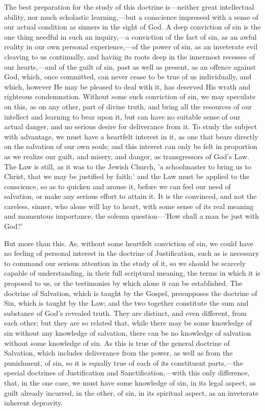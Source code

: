 \documentclass[
]{book}
\begin{document}
The best preparation for the study of this doctrine is---neither great intellectual ability, nor much scholastic learning,---but a conscience impressed with a sense of our actual condition as sinners in the sight of God. A deep conviction of sin is the one thing needful in such an inquiry,---a conviction of the fact of sin, as an awful reality in our own personal experience,---of the power of sin, as an inveterate evil cleaving to us continually, and having its roots deep in the innermost recesses of our hearts,---and of the guilt of sin, past as well as present, as an offence against God, which, once committed, can never cease to be true of us individually, and which, however He may be pleased to deal with it, has deserved His wrath and righteous condemnation. Without some such conviction of sin, we may speculate on this, as on any other, part of divine truth, and bring all the resources of our intellect and learning to bear upon it, but can have no suitable sense of our actual danger, and no serious desire for deliverance from it. To study the subject with advantage, we must have a heartfelt interest in it, as one that bears directly on the salvation of our own souls; and this interest can only be felt in proportion as we realize our guilt, and misery, and danger, as transgressors of God's Law. The Law is still, as it was to the Jewish Church, 'a schoolmaster to bring us to Christ, that we may be justified by faith;' and the Law must be applied to the conscience, so as to quicken and arouse it, before we can feel our need of salvation, or make any serious effort to attain it. It is the convinced, and not the careless, sinner, who alone will lay to heart, with some sense of its real meaning and momentous importance, the solemn question---'How shall a man be just with God?'

But more than this. As, without some heartfelt conviction of sin, we could have no feeling of personal interest in the doctrine of Justification, such as is necessary to command our serious attention in the study of it, so we should be scarcely capable of understanding, in their full scriptural meaning, the terms in which it is proposed to us, or the testimonies by which alone it can be established. The doctrine of Salvation, which is taught by the Gospel, presupposes the doctrine of Sin, which is taught by the Law; and the two together constitute the sum and substance of God's revealed truth. They are distinct, and even different, from each other; but they are so related that, while there may be some knowledge of sin without any knowledge of salvation, there can be no knowledge of salvation without some knowledge of sin. As this is true of the general doctrine of Salvation, which includes deliverance from the power, as well as from the punishment, of sin, so it is equally true of each of its constituent parts,---the special doctrines of Justification and Sanctification,---with this only difference, that, in the one case, we must have some knowledge of sin, in its legal aspect, as guilt already incurred, in the other, of sin, in its spiritual aspect, as an inveterate inherent depravity.
\end{document}
